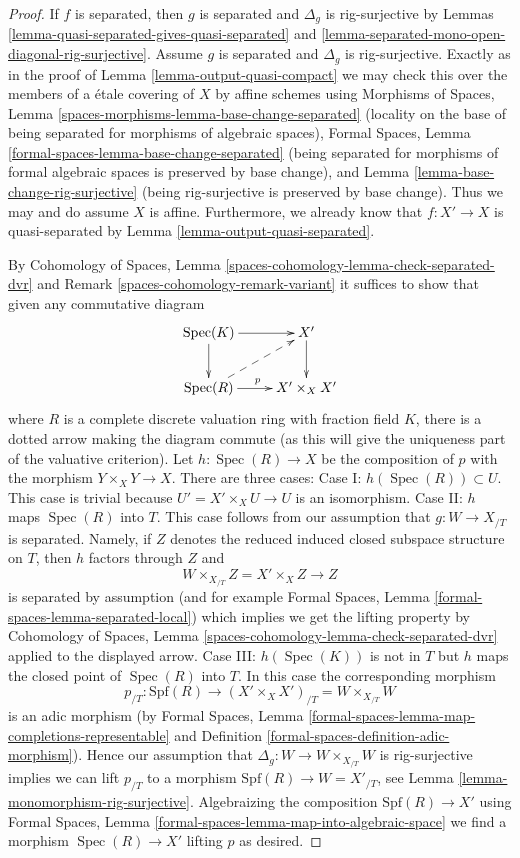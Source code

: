 \documentclass{stacks-project}
\theoremstyle{plain}
\theoremstyle{definition}
\theoremstyle{remark}
\numberwithin{equation}{subsection}
\def\Spec{\mathop{\mathrm{Spec}}}
\begin{document}
\begin{proof}
If $f$ is separated, then $g$ is separated and $\Delta_g$
is rig-surjective by
Lemmas \ref{lemma-quasi-separated-gives-quasi-separated} and
\ref{lemma-separated-mono-open-diagonal-rig-surjective}.
Assume $g$ is separated and $\Delta_g$ is rig-surjective.
Exactly as in the proof of
Lemma \ref{lemma-output-quasi-compact}
we may check this over the members of a \'etale covering of $X$
by affine schemes using
Morphisms of Spaces, Lemma \ref{spaces-morphisms-lemma-base-change-separated}
(locality on the base of being separated for morphisms of algebraic spaces),
Formal Spaces, Lemma \ref{formal-spaces-lemma-base-change-separated}
(being separated for morphisms of formal algebraic spaces is preserved
by base change), and
Lemma \ref{lemma-base-change-rig-surjective} (being rig-surjective
is preserved by base change).
Thus we may and do assume $X$ is affine. Furthermore,
we already know that $f : X' \to X$ is quasi-separated by
Lemma \ref{lemma-output-quasi-separated}.

\medskip\noindent
By Cohomology of Spaces, Lemma
\ref{spaces-cohomology-lemma-check-separated-dvr} and
Remark \ref{spaces-cohomology-remark-variant}
it suffices to show that given any commutative diagram
$$
\xymatrix{
\Spec(K) \ar[r] \ar[d] & X' \ar[d] \\
\Spec(R) \ar[r]^p \ar@{-->}[ru] & X' \times_X X'
}
$$
where $R$ is a complete discrete valuation ring with fraction field $K$,
there is a dotted arrow making the diagram commute (as this will
give the uniqueness part of the valuative criterion). Let
$h : \Spec(R) \to X$ be the composition of $p$ with the morphism
$Y \times_X Y \to X$. There are three cases:
Case I: $h(\Spec(R)) \subset U$. This case is trivial
because $U' = X' \times_X U \to U$ is an isomorphism.
Case II: $h$ maps $\Spec(R)$ into $T$. This case follows
from our assumption that $g : W \to X_{/T}$ is separated. Namely,
if $Z$ denotes the reduced induced closed subspace structure
on $T$, then $h$ factors through $Z$ and
$$
W \times_{X_{/T}} Z = X' \times_X Z \longrightarrow Z
$$
is separated by assumption (and for example
Formal Spaces, Lemma \ref{formal-spaces-lemma-separated-local})
which implies we get the lifting property by
Cohomology of Spaces, Lemma \ref{spaces-cohomology-lemma-check-separated-dvr}
applied to the displayed arrow. Case III: $h(\Spec(K))$ is not in $T$
but $h$ maps the closed point of $\Spec(R)$ into $T$. In this case
the corresponding morphism
$$
p_{/T} :
\text{Spf}(R)
\longrightarrow
(X' \times_X X')_{/T} =
W \times_{X_{/T}} W
$$
is an adic morphism (by
Formal Spaces, Lemma
\ref{formal-spaces-lemma-map-completions-representable} and
Definition \ref{formal-spaces-definition-adic-morphism}).
Hence our assumption that
$\Delta_g : W \to W \times_{X_{/T}} W$ is rig-surjective implies we can lift
$p_{/T}$ to a morphism $\text{Spf}(R) \to W = X'_{/T}$, see
Lemma \ref{lemma-monomorphism-rig-surjective}.
Algebraizing the composition $\text{Spf}(R) \to X'$ using
Formal Spaces, Lemma \ref{formal-spaces-lemma-map-into-algebraic-space}
we find a morphism $\Spec(R) \to X'$ lifting $p$ as desired.
\end{proof}
\end{document}
